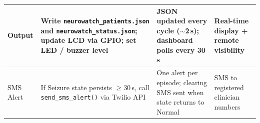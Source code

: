 \documentclass[12pt, a4paper]{report}
\begin{document}
\begin{landscape}
\begin{table}[H]
{\begin{tabular}{|p{3.2cm}|p{5.0cm}|p{5.5cm}|p{4.5cm}|}
Output &
Write \texttt{neurowatch\_patients.json} and \texttt{neurowatch\_status.json};
update LCD via GPIO; set LED / buzzer level &
JSON updated every cycle ($\sim$2\,s); dashboard polls every 30\,s &
Real-time display + remote visibility \\
\hline

\rowcolor{lightgray}
SMS Alert &
If Seizure state persists $\geq$30\,s, call \texttt{send\_sms\_alert()} via Twilio API &
One alert per episode; clearing SMS sent when state returns to Normal &
SMS to registered clinician numbers \\
\hline

\end{tabular}
}
\end{table}
\end{landscape}

\end{document}
